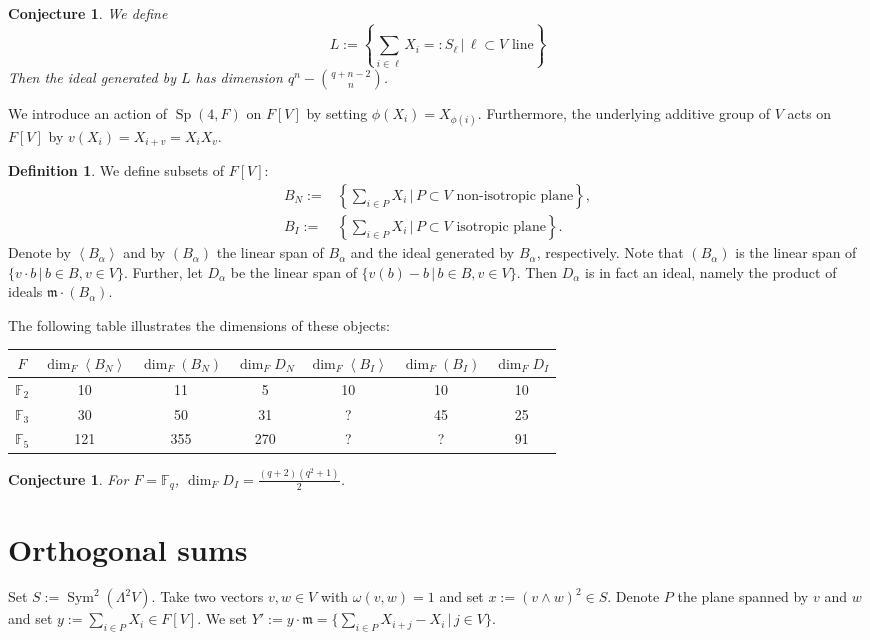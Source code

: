 \documentclass{amsart}
\DeclareMathOperator{\Sp}{Sp}
\DeclareMathOperator{\Sym}{Sym}
\theoremstyle{plain}
\newtheorem{conjecture}[theorem]{Conjecture}
\theoremstyle{definition}
\newtheorem{definition}[theorem]{Definition}
\theoremstyle{remark}
\begin{document}
\begin{conjecture} We define
$$
L := \left\{\sum_{i\in \ell}X_i=:S_\ell \,|\, \ell\subset V \text{ line}\right\}
$$
Then the ideal generated by $L$ has dimension $q^n - \binom{q+n-2}{n}$.
\end{conjecture}


We introduce an action of $\Sp (4,F)$ on $F[V]$ by setting $\phi(X_i) = X_{\phi(i)}$. Furthermore, the underlying additive group of $V$ acts on $F[V]$ by $v( X_i) = X_{i+v} =X_iX_v$. 

\begin{definition} We define subsets of $F[V]$:
\begin{align*}
B_N :=  & \left\{\sum_{i\in P}X_i \,|\, P\subset V \text{ non-isotropic plane}\right\}, \\
B_I := &  \left\{\sum_{i\in P}X_i \,|\, P\subset V \text{ isotropic plane}\right\}.
\end{align*}
Denote by $\left< B_\alpha \right>$ and by $(B_\alpha)$ the linear span of $B_\alpha$ and the ideal generated by $B_\alpha$, respectively. Note that $(B_\alpha) $ is the linear span of $ \{ v\cdot b \,|\, b\in B, v\in V \}$.
Further, let $D_\alpha$ be the linear span of $\{v(b) - b \,|\, b\in B, v\in V \}$. Then $D_\alpha$ is in fact an ideal, namely the product of ideals $\mathfrak m\cdot (B_\alpha)$.
\end{definition}
The following table illustrates the dimensions of these objects:
\vspace{2mm}

\begin{tabular}{c||c|c|c||c|c|c}
 $F$ & $\dim_F \left<B_N\right>$ & $\dim_F(B_N)$ & $\dim_F D_N$ & $\dim_F \left<B_I\right>$ & $\dim_F(B_I)$ & $\dim_F D_I $\\
\hline
$\mathbb F_2$ & 10 & 11 &  5 & 10 & 10 & 10 \\
$\mathbb F_3$ & 30 & 50 & 31 & ? & 45 & 25 \\
$\mathbb F_5$ &121 &355 &270 & ? & ? & 91 
\end{tabular}
\begin{conjecture}
For $F=\mathbb F_q$, $\dim_F D_I = \frac{(q+2)(q^2+1)}{2}$.
\end{conjecture}


\section{Orthogonal sums}
Set $S:=\Sym^2 (\Lambda^2V)$. Take two vectors $v,w\in V$ with $\omega(v,w)=1$ and set $x:= (v\wedge w)^2\in S$. Denote $P$ the plane spanned by $v$ and $w$ and set $y:= \sum_{i\in P}X_i\in  F[V]$.
We set $Y':=y\cdot \mathfrak{m} = \{\sum_{i\in P} X_{i+j}-X_i\,|\, j\in V \} $.
\end{document}
